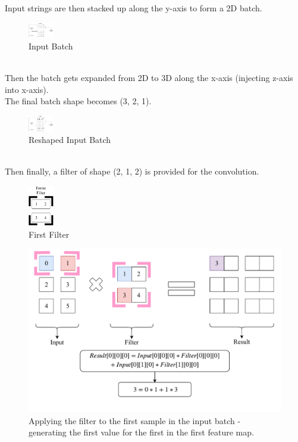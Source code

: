 \documentclass[12pt]{article}
\newcommand\tab[1][1cm]{\hspace*{#1}}
\begin{document}
\tab Input strings are then stacked up along the y-axis to form a 2D batch.
\begin{figure}[!htbp]
\begin{center}
	\includegraphics[width=0.1\textwidth]{input_final}
	\caption{Input Batch}
\end{center}
\end{figure}\\
\tab Then the batch gets expanded from 2D to 3D along the x-axis (injecting z-axis into x-axis).\\
\tab The final batch shape becomes  (3, 2, 1).
\begin{figure}[!htbp]
\begin{center}
	\includegraphics[width=0.1\textwidth]{input_reshaped}
	\caption{Reshaped Input Batch}
\end{center}
\end{figure}\\
\tab Then finally, a filter of shape (2, 1, 2) is provided for the convolution.
\begin{figure}[!htbp]
\begin{center}
	\includegraphics[width=0.1\textwidth]{filter1}
	\caption{First Filter}
\end{center}
\end{figure}
\newpage
\begin{figure}[!htbp]
\begin{center}
	\includegraphics[width=\textwidth]{firstConvSample_step1}
	\begin{center}
		\caption{ Applying the filter to the first sample in the input batch - generating the first value for the first  in the first feature map.}
	\end{center}
\end{center}
\end{figure}
\end{document}
